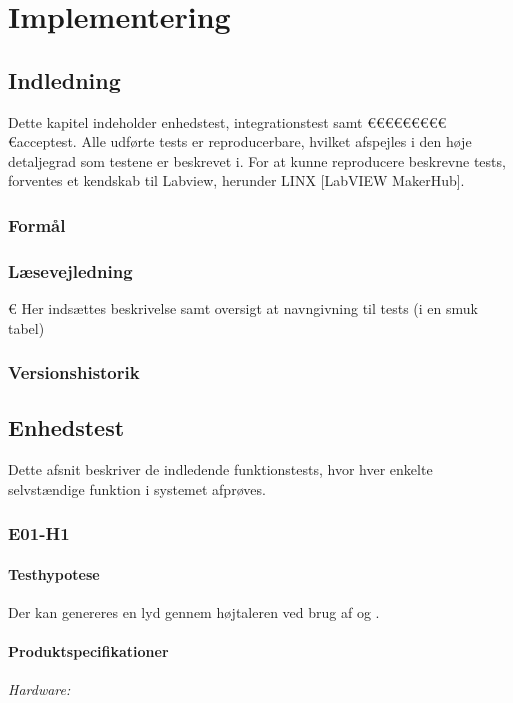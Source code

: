 \chapter{Implementering}

\section{Indledning}
	Dette kapitel indeholder enhedstest, integrationstest samt €€€€€€€€€€acceptest. Alle udførte tests er reproducerbare, hvilket afspejles i den høje detaljegrad som testene er beskrevet i. For at kunne reproducere beskrevne tests, forventes et kendskab til Labview, herunder LINX [LabVIEW MakerHub]. 
	
	    	  
		\subsection{Formål}
	
		\subsection{Læsevejledning}	
	€ Her indsættes beskrivelse samt oversigt at navngivning til tests (i en smuk tabel)
		
		\subsection{Versionshistorik}

 
\section{Enhedstest}
	Dette afsnit beskriver de indledende funktionstests, hvor hver enkelte selvstændige funktion i systemet afprøves. 
	
	\subsection{E01-H1}
	\label{subsec:E01}
		\subsubsection{Testhypotese}
		Der kan genereres en lyd gennem højtaleren ved brug af \arduino{} og \labview.		
		\subsubsection{Produktspecifikationer}
	
	
		\textit{Hardware:}\\
		\\
		\hojtalerkabel\\
		\pins\\
		\arduino\\
		\PC\\
		\usbkabel
	
